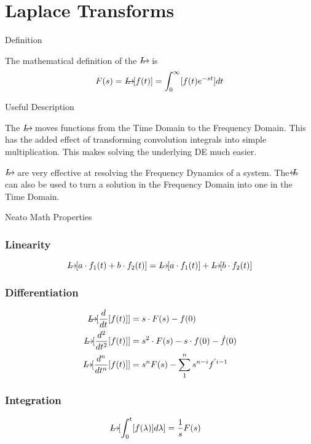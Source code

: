 \documentclass{../templates/mathtool}
\begin{document}
\chapter{Laplace Transforms}

\begin{section}{Definition}
	
	The mathematical definition of the $\laplace$ is
	\begin{equation}
		F(s) = \laplace[f(t)] = \int_0^\infty[f(t)e^{-st}]dt
	\end{equation}
	
\end{section}

\begin{section}{Useful Description}
	
	The $\laplace$ moves functions from the Time Domain to the Frequency Domain. This has the added effect of transforming convolution integrals into simple multiplication. This makes solving the underlying DE much easier.
	
	$\laplace$ are very effective at resolving the Frequency Dynamics of a system. The $\ilaplace$ can also be used to turn a solution in the Frequency Domain into one in the Time Domain.
	
\end{section}

\begin{section}{Neato Math Properties}
	\subsection{Linearity}
		\begin{equation*}
			\laplace[a \cdot f_1(t) + b \cdot f_2(t)] = \laplace[a \cdot f_1(t)] + \laplace[b \cdot f_2(t)]
		\end{equation*}
	
	\subsection{Differentiation}
		\begin{align*}
			\laplace[\frac{d}{dt}[f(t)]] &= s \cdot F(s)-f(0) \\
			\laplace[\frac{d^2}{dt^2}[f(t)]] &= s^2 \cdot F(s)- s \cdot f(0) -\dot{f}(0) \\
			\laplace[\frac{d^n}{dt^n}[f(t)]] &= s^n F(s) - \sum_1^n s^{n-i} f^{'i-1}
		\end{align*}
	
	\subsection{Integration}
		\begin{align*}
			\laplace[\int_{0}^{t}[f(\lambda)]d\lambda] &= \frac{1}{s}F(s)
		\end{align*}
\end{section}
\end{document}
